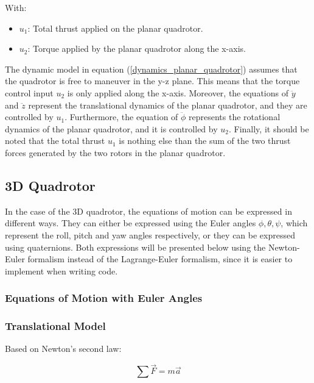 \documentclass{thesisreport}
\begin{document}
With: 

\begin{itemize}
	\item $u_1$: Total thrust applied on the planar quadrotor.
	\item $u_2$: Torque applied by the planar quadrotor along the x-axis.
\end{itemize}

The dynamic model in equation (\ref{dynamics_planar_quadrotor}) assumes that the quadrotor is free to maneuver in the y-z plane. This means that the torque control input $u_2$ is only applied along the x-axis. 
Moreover, the equations of $\ddot{y}$ and $\ddot{z}$ represent the translational dynamics of the planar quadrotor, and they are controlled by $u_1$.
Furthermore, the equation of $\ddot{\phi}$ represents the rotational dynamics of the planar quadrotor, and it is controlled by $u_2$.
Finally, it should be noted that the total thrust $u_1$ is nothing else than the sum of the two thrust forces generated by the two rotors in the planar quadrotor.

\newpage

\subsection{3D Quadrotor}

In the case of the 3D quadrotor, the equations of motion can be expressed in different ways. They can either be expressed using the Euler angles $\phi, \theta, \psi$, which represent the roll, pitch and yaw angles respectively, or they can be expressed using quaternions. Both expressions will be presented below using the Newton-Euler formalism instead of the Lagrange-Euler formalism, since it is easier to implement when writing code.

\subsubsection{Equations of Motion with Euler Angles}\label{N_E_section}

\subsubsection*{Translational Model}

Based on Newton's second law:

\begin{equation}
	\sum \overrightarrow{F}=m\overrightarrow{a}
\end{equation}
\end{document}
